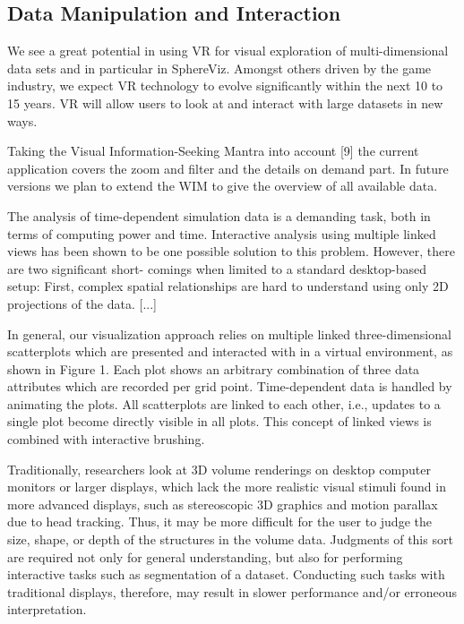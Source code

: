 \subsection{Data Manipulation and Interaction}






We see a great potential in using VR for visual exploration of multi-dimensional data sets and in particular in SphereViz. Amongst others driven by the game industry, we expect VR technology to evolve significantly within the next 10 to 15 years. VR will allow users to look at and interact with large datasets in new ways.
\cite{Soldati2007}

Taking the Visual Information-Seeking Mantra into account [9] the current application covers the zoom and filter and the details on demand part. In future versions we plan to extend the WIM to give the overview of all available data.
\cite{Soldati2007}

The analysis of time-dependent simulation data is a demanding task, both in terms of computing power and time. Interactive analysis using multiple linked views has been shown to be one possible solution to this problem. However, there are two significant short- comings when limited to a standard desktop-based setup: First, complex spatial relationships are hard to understand using only 2D projections of the data. [...]
\cite{Hentschel2009}

In general, our visualization approach relies on multiple linked three-dimensional scatterplots which are presented and interacted with in a virtual environment, as shown in Figure 1. Each plot shows an arbitrary combination of three data attributes which are recorded per grid point. Time-dependent data is handled by animating the plots. All scatterplots are linked to each other, i.e., updates to a single plot become directly visible in all plots. This concept of linked views is combined with interactive brushing.
\cite{Hentschel2009}

Traditionally, researchers look at 3D volume renderings on desktop computer monitors or larger displays, which lack the more realistic visual stimuli found in more advanced displays, such as stereoscopic 3D graphics and motion parallax due to head tracking. Thus, it may be more difficult for the user to judge the size, shape, or depth of the structures in the volume data. Judgments of this sort are required not only for general understanding, but also for performing interactive tasks such as segmentation of a dataset. Conducting such tasks with traditional displays, therefore, may result in slower performance and/or erroneous interpretation.
\cite{Laha2012}

